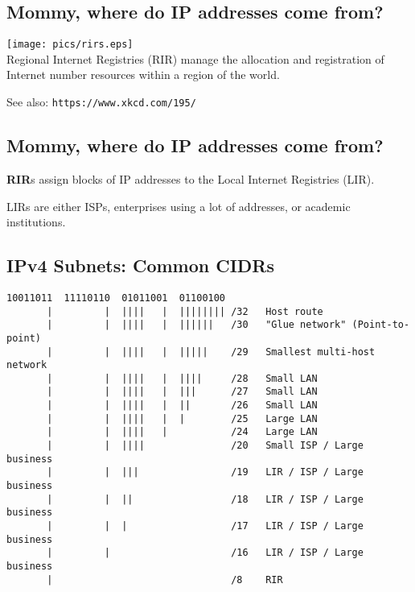 \documentclass[xga]{xdvislides}
\begin{document}
\subsection{Mommy, where do IP addresses come from?}
\vspace*{\fill}
\begin{center}
	\texttt{[image: pics/rirs.eps]} \\
	\vspace{.5in}
	Regional Internet Registries (RIR) manage the allocation and
registration of Internet number resources within a region of the world.
\end{center}
\vspace*{\fill}

See also: \verb+https://www.xkcd.com/195/+

\subsection{Mommy, where do IP addresses come from?}
\vspace*{\fill}
\begin{center}
{\bf RIR}s assign blocks of IP addresses to the Local Internet Registries (LIR).
\\
\vspace{.5in}

LIRs are either ISPs, enterprises using a lot of addresses, or academic
institutions.
\end{center}
\vspace*{\fill}

\subsection{IPv4 Subnets: Common CIDRs}
\begin{verbatim}
10011011  11110110  01011001  01100100
       |         |  ||||   |  |||||||| /32   Host route
       |         |  ||||   |  ||||||   /30   "Glue network" (Point-to-point)
       |         |  ||||   |  |||||    /29   Smallest multi-host network
       |         |  ||||   |  ||||     /28   Small LAN
       |         |  ||||   |  |||      /27   Small LAN
       |         |  ||||   |  ||       /26   Small LAN
       |         |  ||||   |  |        /25   Large LAN
       |         |  ||||   |           /24   Large LAN
       |         |  ||||               /20   Small ISP / Large business
       |         |  |||                /19   LIR / ISP / Large business
       |         |  ||                 /18   LIR / ISP / Large business
       |         |  |                  /17   LIR / ISP / Large business
       |         |                     /16   LIR / ISP / Large business
       |                               /8    RIR
\end{verbatim}
\end{document}
